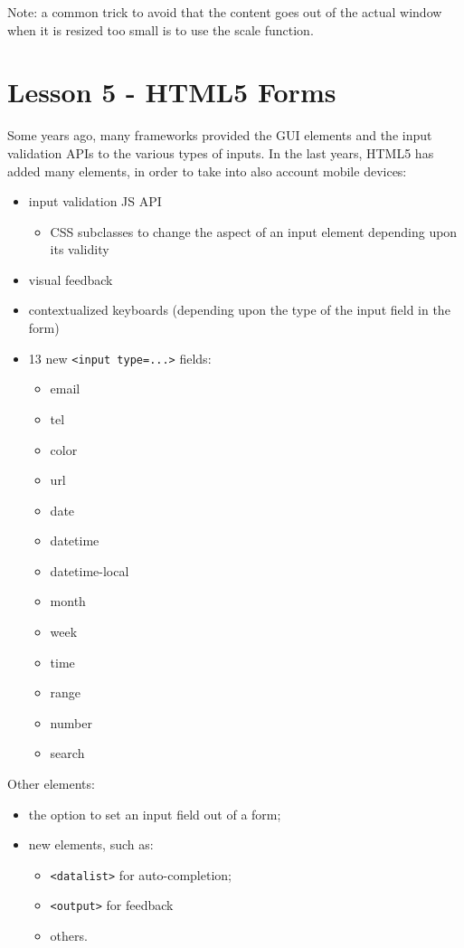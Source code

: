 \documentclass[a4paper,11pt]{book}
\begin{document}
Note: a common trick to avoid that the content goes out of the actual window when
it is resized too small is to use the scale function.


\chapter{Lesson 5 - HTML5 Forms}
Some years ago, many frameworks provided the GUI elements and the
input validation APIs to the various types of inputs. In the last
years, HTML5 has added many elements, in order to take into also
account mobile devices:
\begin{itemize}
\item input validation JS API
	\begin{itemize}
	\item CSS subclasses to change the aspect of an input element depending upon
		its validity
	\end{itemize}
\item visual feedback
\item contextualized keyboards (depending upon the type of the input field in the form)
\item 13 new \texttt{<input type=...>} fields:
	\begin{itemize}
	\item email
	\item tel
	\item color
	\item url
	\item date
	\item datetime
	\item datetime-local
	\item month
	\item week
	\item time
	\item range
	\item number
	\item search
	\end{itemize}
\end{itemize}
Other elements:
\begin{itemize}
\item the option to set an input field out of a form;
\item new elements, such as:
	\begin{itemize}
	\item \texttt{<datalist>} for auto-completion;
	\item \texttt{<output>} for feedback
	\item others.
	\end{itemize}
\end{itemize}
\end{document}
